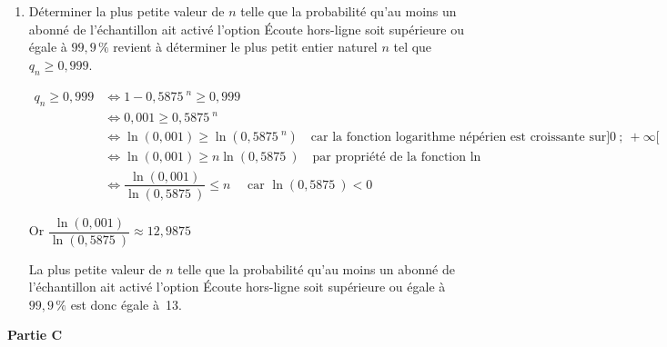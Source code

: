 \documentclass[10pt]{article}
\providecommand{\np}[2][]{{#2~#1}}
\begin{document}
\begin{enumerate}
\begin{enumerate}
Pour tout $n$ entier naturel non nul, on a bien \quad $q_{n}=1- \np{0,5875}^{n}$.

		\item Déterminer la plus petite valeur de $n$ telle que la probabilité qu'au moins un abonné de l'échantillon ait activé l'option \og Écoute hors-ligne\fg{} soit supérieure ou égale à $99,9\,\%$ revient à déterminer le plus petit entier naturel $n$ tel que $q_n \geqslant 0,999$.

$\begin{aligned}
q_n \geqslant 0,999 & \iff 1-\np{0,5875}^{n} \geqslant0,999 \\
& \iff 0,001 \geqslant \np{0,5875}^n \\
& \iff \ln(0,001) \geqslant \ln (\np{0,5875}^n) \quad \text{car la fonction logarithme népérien est croissante sur} ]0~;~+\infty[\\
& \iff \ln(0,001) \geqslant n\ln (\np{0,5875}) \quad \text{par propriété de la fonction ln}\\
& \iff \dfrac{\ln(0,001)}{\ln(\np{0,5875})} \leqslant n \quad \text{ car } \ln(\np{0,5875}) < 0
\end{aligned}$

Or $\dfrac{\ln(0,001)}{\ln(\np{0,5875})} \approx \np{12,9875}$

La plus petite valeur de $n$ telle que la probabilité qu'au moins un abonné de l'échantillon ait activé l'option \og Écoute hors-ligne\fg{} soit supérieure ou égale à $99,9\,\%$ est donc égale à~13.
	\end{enumerate}
\end{enumerate}

	\textbf{Partie C}
\end{document}
